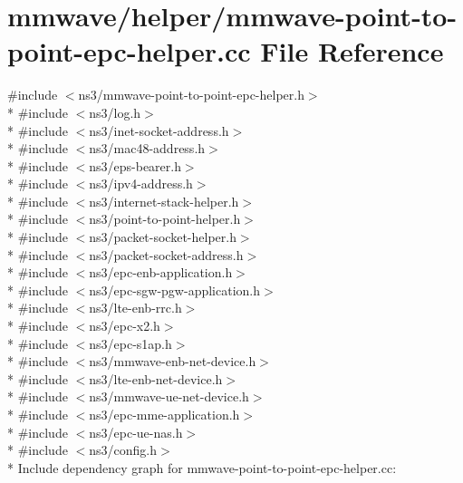 \hypertarget{mmwave-point-to-point-epc-helper_8cc}{}\section{mmwave/helper/mmwave-\/point-\/to-\/point-\/epc-\/helper.cc File Reference}
\label{mmwave-point-to-point-epc-helper_8cc}
{\ttfamily \#include $<$ns3/mmwave-\/point-\/to-\/point-\/epc-\/helper.\+h$>$}\\*
{\ttfamily \#include $<$ns3/log.\+h$>$}\\*
{\ttfamily \#include $<$ns3/inet-\/socket-\/address.\+h$>$}\\*
{\ttfamily \#include $<$ns3/mac48-\/address.\+h$>$}\\*
{\ttfamily \#include $<$ns3/eps-\/bearer.\+h$>$}\\*
{\ttfamily \#include $<$ns3/ipv4-\/address.\+h$>$}\\*
{\ttfamily \#include $<$ns3/internet-\/stack-\/helper.\+h$>$}\\*
{\ttfamily \#include $<$ns3/point-\/to-\/point-\/helper.\+h$>$}\\*
{\ttfamily \#include $<$ns3/packet-\/socket-\/helper.\+h$>$}\\*
{\ttfamily \#include $<$ns3/packet-\/socket-\/address.\+h$>$}\\*
{\ttfamily \#include $<$ns3/epc-\/enb-\/application.\+h$>$}\\*
{\ttfamily \#include $<$ns3/epc-\/sgw-\/pgw-\/application.\+h$>$}\\*
{\ttfamily \#include $<$ns3/lte-\/enb-\/rrc.\+h$>$}\\*
{\ttfamily \#include $<$ns3/epc-\/x2.\+h$>$}\\*
{\ttfamily \#include $<$ns3/epc-\/s1ap.\+h$>$}\\*
{\ttfamily \#include $<$ns3/mmwave-\/enb-\/net-\/device.\+h$>$}\\*
{\ttfamily \#include $<$ns3/lte-\/enb-\/net-\/device.\+h$>$}\\*
{\ttfamily \#include $<$ns3/mmwave-\/ue-\/net-\/device.\+h$>$}\\*
{\ttfamily \#include $<$ns3/epc-\/mme-\/application.\+h$>$}\\*
{\ttfamily \#include $<$ns3/epc-\/ue-\/nas.\+h$>$}\\*
{\ttfamily \#include $<$ns3/config.\+h$>$}\\*
Include dependency graph for mmwave-\/point-\/to-\/point-\/epc-\/helper.cc\+:
